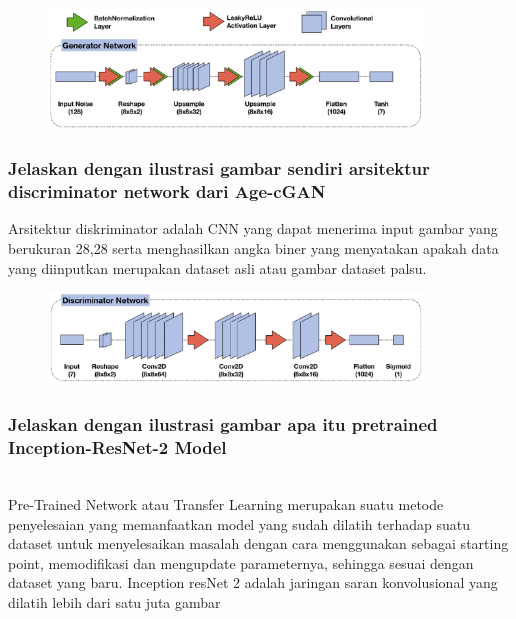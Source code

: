 	\begin{figure}[H]
		\begin{center}
		 \includegraphics[width=10cm]{figures/1174076/figures9/teori4.png}
		 \caption{}	
		\end{center}
	\end{figure}
	
	\subsubsection{Jelaskan dengan ilustrasi gambar sendiri arsitektur discriminator network dari Age-cGAN} 
	\hfill
	Arsitektur diskriminator adalah CNN yang dapat menerima input gambar yang berukuran 28,28 serta menghasilkan angka biner yang menyatakan apakah data yang diinputkan merupakan dataset asli atau gambar dataset palsu.
	
	\begin{figure}[H]
		\begin{center}
		 \includegraphics[width=10cm]{figures/1174076/figures9/teori5.png}
		 \caption{}	
		\end{center}
	\end{figure}
	
	\subsubsection{Jelaskan dengan ilustrasi gambar apa itu pretrained Inception-ResNet-2 Model}
	\hfill\\
	Pre-Trained Network atau Transfer Learning merupakan suatu metode penyelesaian yang memanfaatkan model yang sudah dilatih terhadap suatu dataset untuk menyelesaikan masalah dengan cara menggunakan sebagai starting point, memodifikasi dan mengupdate parameternya, sehingga sesuai dengan dataset yang baru.
	Inception resNet 2 adalah jaringan saran konvolusional yang dilatih lebih dari satu juta gambar
	
